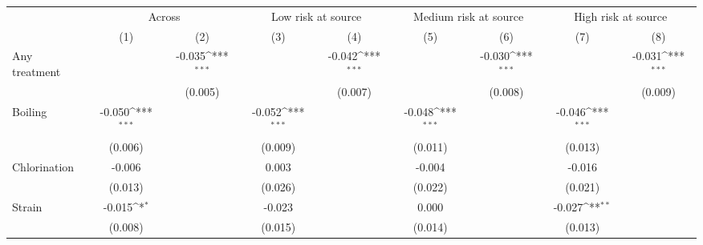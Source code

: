 {
\def\sym#1{\ifmmode^{#1}\else\(^{#1}\)\fi}
\begin{tabular}{l*{8}{c}}
\hline\hline
                    &\multicolumn{2}{c}{Across}                 &\multicolumn{2}{c}{Low risk at source}     &\multicolumn{2}{c}{Medium risk at source}  &\multicolumn{2}{c}{High risk at source}    \\\cmidrule(lr){2-3}\cmidrule(lr){4-5}\cmidrule(lr){6-7}\cmidrule(lr){8-9}
                    &\multicolumn{1}{c}{(1)}         &\multicolumn{1}{c}{(2)}         &\multicolumn{1}{c}{(3)}         &\multicolumn{1}{c}{(4)}         &\multicolumn{1}{c}{(5)}         &\multicolumn{1}{c}{(6)}         &\multicolumn{1}{c}{(7)}         &\multicolumn{1}{c}{(8)}         \\
\hline
Any treatment &                     &      -0.035\sym{***}&                     &      -0.042\sym{***}&                     &      -0.030\sym{***}&                     &      -0.031\sym{***}\\
                    &                     &     (0.005)         &                     &     (0.007)         &                     &     (0.008)         &                     &     (0.009)         \\
Boiling             &      -0.050\sym{***}&                     &      -0.052\sym{***}&                     &      -0.048\sym{***}&                     &      -0.046\sym{***}&                     \\
                    &     (0.006)         &                     &     (0.009)         &                     &     (0.011)         &                     &     (0.013)         &                     \\
Chlorination        &      -0.006         &                     &       0.003         &                     &      -0.004         &                     &      -0.016         &                     \\
                    &     (0.013)         &                     &     (0.026)         &                     &     (0.022)         &                     &     (0.021)         &                     \\
Strain              &      -0.015\sym{*}  &                     &      -0.023         &                     &       0.000         &                     &      -0.027\sym{**} &                     \\
                    &     (0.008)         &                     &     (0.015)         &                     &     (0.014)         &                     &     (0.013)         &                     \\

\end{tabular}}
